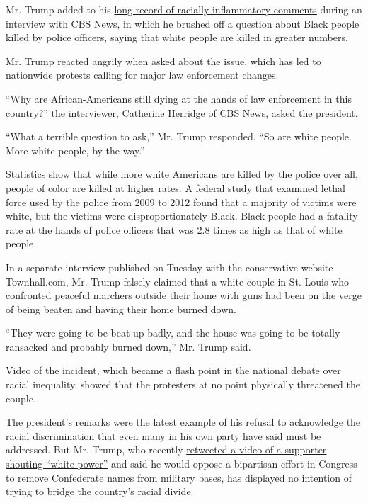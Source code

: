 Mr. Trump added to his
\href{https://www.nytimes3xbfgragh.onion/2020/06/23/us/politics/trump-race-racism-protests.html}{long
record of racially inflammatory comments} during an interview with CBS
News, in which he brushed off a question about Black people killed by
police officers, saying that white people are killed in greater numbers.

Mr. Trump reacted angrily when asked about the issue, which has led to
nationwide protests calling for major law enforcement changes.

``Why are African-Americans still dying at the hands of law enforcement
in this country?'' the interviewer, Catherine Herridge of CBS News,
asked the president.

``What a terrible question to ask,'' Mr. Trump responded. ``So are white
people. More white people, by the way.''

Statistics show that while more white Americans are killed by the police
over all, people of color are killed at higher rates. A federal study
that examined lethal force used by the police from 2009 to 2012 found
that a majority of victims were white, but the victims were
disproportionately Black. Black people had a fatality rate at the hands
of police officers that was 2.8 times as high as that of white people.

In a separate interview published on Tuesday with the conservative
website Townhall.com, Mr. Trump falsely claimed that a white couple in
St. Louis who confronted peaceful marchers outside their home with guns
had been on the verge of being beaten and having their home burned down.

``They were going to be beat up badly, and the house was going to be
totally ransacked and probably burned down,'' Mr. Trump said.

Video of the incident, which became a flash point in the national debate
over racial inequality, showed that the protesters at no point
physically threatened the couple.

The president's remarks were the latest example of his refusal to
acknowledge the racial discrimination that even many in his own party
have said must be addressed. But Mr. Trump, who recently
\href{https://www.nytimes3xbfgragh.onion/2020/06/28/us/politics/trump-white-power-video-racism.html}{retweeted
a video of a supporter shouting ``white power''} and said he would
oppose a bipartisan effort in Congress to remove Confederate names from
military bases, has displayed no intention of trying to bridge the
country's racial divide.

